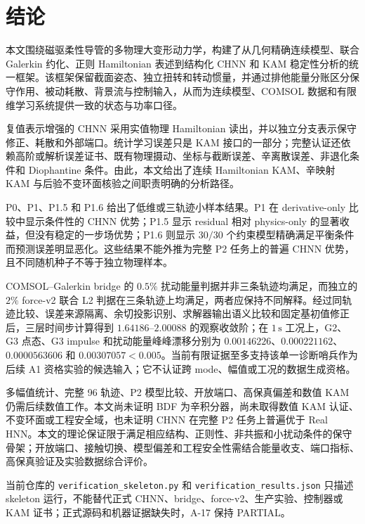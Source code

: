 \section{结论}\label{sec:conclusion}

本文围绕磁驱柔性导管的多物理大变形动力学，构建了从几何精确连续模型、联合 Galerkin 约化、正则 Hamiltonian 表述到结构化 CHNN 和 KAM 稳定性分析的统一框架。该框架保留截面姿态、独立扭转和转动惯量，并通过排他能量分账区分保守作用、被动耗散、背景流与控制输入，从而为连续模型、COMSOL 数据和有限维学习系统提供一致的状态与功率口径。

复值表示增强的 CHNN 采用实值物理 Hamiltonian 读出，并以独立分支表示保守修正、耗散和外部端口。统计学习误差只是 KAM 接口的一部分；完整认证还依赖高阶或解析误差证书、既有物理摄动、坐标与截断误差、辛离散误差、非退化条件和 Diophantine 条件。由此，本文给出了连续 Hamiltonian KAM、辛映射 KAM 与后验不变环面核验之间职责明确的分析路径。

P0、P1、P1.5 和 P1.6 给出了低维或三轨迹小样本结果。P1 在 derivative-only 比较中显示条件性的 CHNN 优势；P1.5 显示 residual 相对 physics-only 的显著收益，但没有稳定的一步场优势；P1.6 则显示 \(30/30\) 个约束模型精确满足平衡条件而预测误差明显恶化。这些结果不能外推为完整 P2 任务上的普遍 CHNN 优势，且不同随机种子不等于独立物理样本。

COMSOL--Galerkin bridge 的 \(0.5\%\) 扰动能量判据并非三条轨迹均满足，而独立的 \(2\%\) force-v2 联合 L2 判据在三条轨迹上均满足，两者应保持不同解释。经过同轨迹比较、误差来源隔离、余切投影识别、求解器输出语义比较和固定基初值修正后，三层时间步计算得到 \(1.64186\)--\(2.00088\) 的观察收敛阶；在 \(1\,\mathrm{s}\) 工况上，G2、G3 点态、G3 impulse 和扰动能量峰峰漂移分别为 \(0.00146226\)、\(0.000221162\)、\(0.0000563606\) 和 \(0.00307057<0.005\)。当前有限证据至多支持该单一诊断哨兵作为后续 A1 资格实验的候选输入；它不认证跨 mode、幅值或工况的数据生成资格。

多幅值统计、完整 96 轨迹、P2 模型比较、开放端口、高保真偏差和数值 KAM 仍需后续数值工作。本文尚未证明 BDF 为辛积分器，尚未取得数值 KAM 认证、不变环面或工程安全域，也未证明 CHNN 在完整 P2 任务上普遍优于 Real HNN。本文的理论保证限于满足相应结构、正则性、非共振和小扰动条件的保守骨架；开放端口、接触切换、模型偏差和工程安全性需结合能量收支、端口指标、高保真验证及实验数据综合评价。

当前仓库的 \texttt{verification\_skeleton.py} 和 \texttt{verification\_results.json} 只描述 skeleton 运行，不能替代正式 CHNN、bridge、force-v2、生产实验、控制器或 KAM 证书；正式源码和机器证据缺失时，A-17 保持 PARTIAL。

